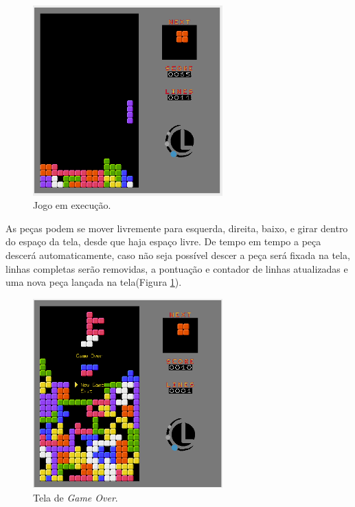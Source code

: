 \documentclass{article}
\begin{document}
\begin{figure}[H]
  \begin{center}
    \includegraphics[width=0.65\textwidth]{images/InGame.png} %
    \caption{Jogo em execução.}
    \label{InGame}
  \end{center}
\end{figure}

As peças podem se mover livremente para esquerda, direita, baixo, e girar dentro do espaço da tela, desde que haja espaço livre.
De tempo em tempo a peça descerá automaticamente, caso não seja possível descer a peça será fixada na tela, linhas completas serão removidas, a pontuação e contador de linhas atualizadas e uma nova peça lançada na tela(Figura \ref{InGame}).

\begin{figure}[H]
  \begin{center}
    \includegraphics[width=0.65\textwidth]{images/GameOver.png} %
    \caption{Tela de \textit{Game Over}.}
    \label{GameOver}
  \end{center}
\end{figure}
\end{document}
